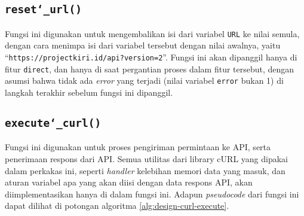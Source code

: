 \subsection{\texttt{reset\char`_url()}}
\label{sec:design-code-buildurl-reset}

Fungsi ini digunakan untuk mengembalikan isi dari variabel \verb|URL| ke nilai semula, dengan cara menimpa isi dari variabel tersebut dengan nilai awalnya, yaitu ``\texttt{https://projectkiri.id/api?version=2}''. Fungsi ini akan dipanggil hanya di fitur \verb|direct|, dan hanya di saat pergantian proses dalam fitur tersebut, dengan asumsi bahwa tidak ada \textit{error} yang terjadi (nilai variabel \verb|error| bukan 1) di langkah terakhir sebelum fungsi ini dipanggil.
	
\subsection{\texttt{execute\char`_curl()}}
\label{sec:design-code-curl-execute}

Fungsi ini digunakan untuk proses pengiriman permintaan ke API, serta penerimaan respons dari API. Semua utilitas dari library cURL yang dipakai dalam perkakas ini, seperti \textit{handler} kelebihan memori data yang masuk, dan aturan variabel apa yang akan diisi dengan data respons API, akan diimplementasikan hanya di dalam fungsi ini. Adapun \textit{pseudocode} dari fungsi ini dapat dilihat di potongan algoritma \ref{alg:design-curl-execute}.

